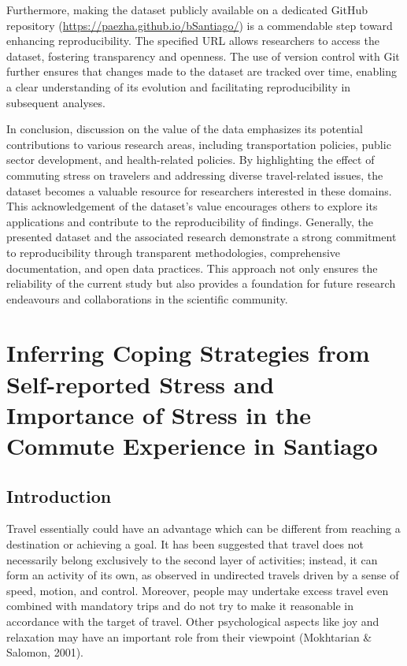 \documentclass[
11pt, %
oneside, %
english, %
singlespacing, %
]{macthesis} %
\begin{document}
Furthermore, making the dataset publicly available on a dedicated GitHub repository (\url{https://paezha.github.io/bSantiago/}) is a commendable step toward enhancing reproducibility. The specified URL allows researchers to access the dataset, fostering transparency and openness. The use of version control with Git further ensures that changes made to the dataset are tracked over time, enabling a clear understanding of its evolution and facilitating reproducibility in subsequent analyses.

In conclusion, discussion on the value of the data emphasizes its potential contributions to various research areas, including transportation policies, public sector development, and health-related policies. By highlighting the effect of commuting stress on travelers and addressing diverse travel-related issues, the dataset becomes a valuable resource for researchers interested in these domains. This acknowledgement of the dataset's value encourages others to explore its applications and contribute to the reproducibility of findings. Generally, the presented dataset and the associated research demonstrate a strong commitment to reproducibility through transparent methodologies, comprehensive documentation, and open data practices. This approach not only ensures the reliability of the current study but also provides a foundation for future research endeavours and collaborations in the scientific community.

\hypertarget{inferring-coping-strategies-from-self-reported-stress-and-importance-of-stress-in-the-commute-experience-in-santiago}{%
\chapter{Inferring Coping Strategies from Self-reported Stress and Importance of Stress in the Commute Experience in Santiago}\label{inferring-coping-strategies-from-self-reported-stress-and-importance-of-stress-in-the-commute-experience-in-santiago}}

\hypertarget{introduction-3}{%
\section{Introduction}\label{introduction-3}}

Travel essentially could have an advantage which can be different from reaching a destination or achieving a goal. It has been suggested that travel does not necessarily belong exclusively to the second layer of activities; instead, it can form an activity of its own, as observed in undirected travels driven by a sense of speed, motion, and control. Moreover, people may undertake excess travel even combined with mandatory trips and do not try to make it reasonable in accordance with the target of travel. Other psychological aspects like joy and relaxation may have an important role from their viewpoint (Mokhtarian \& Salomon, 2001).
\end{document}
